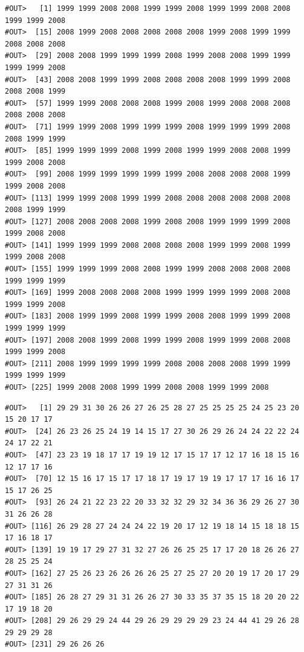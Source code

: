 \documentclass[]{book}
\newenvironment{Shaded}{\begin{snugshade}}{\end{snugshade}}
\newcommand{\OperatorTok}[1]{\textcolor[rgb]{0.81,0.36,0.00}{\textbf{#1}}}
\newcommand{\NormalTok}[1]{#1}
\theoremstyle{definition}
\theoremstyle{definition}
\theoremstyle{definition}
\theoremstyle{remark}
\begin{document}
\begin{Shaded}
\end{Shaded}

\begin{verbatim}
#OUT>   [1] 1999 1999 2008 2008 1999 1999 2008 1999 1999 2008 2008 1999 1999 2008
#OUT>  [15] 2008 1999 2008 2008 2008 2008 2008 1999 2008 1999 1999 2008 2008 2008
#OUT>  [29] 2008 2008 1999 1999 1999 2008 1999 2008 2008 1999 1999 1999 1999 2008
#OUT>  [43] 2008 2008 1999 1999 2008 2008 2008 2008 1999 1999 2008 2008 2008 1999
#OUT>  [57] 1999 1999 2008 2008 2008 1999 2008 1999 2008 2008 2008 2008 2008 2008
#OUT>  [71] 1999 1999 2008 1999 1999 1999 2008 1999 1999 1999 2008 2008 1999 1999
#OUT>  [85] 1999 1999 1999 2008 1999 2008 1999 1999 2008 2008 1999 1999 2008 2008
#OUT>  [99] 2008 1999 1999 1999 1999 1999 2008 2008 2008 2008 1999 1999 2008 2008
#OUT> [113] 1999 1999 2008 1999 1999 2008 2008 2008 2008 2008 2008 2008 1999 1999
#OUT> [127] 2008 2008 2008 2008 1999 2008 2008 1999 1999 1999 2008 1999 2008 2008
#OUT> [141] 1999 1999 1999 2008 2008 2008 2008 1999 1999 2008 1999 1999 2008 2008
#OUT> [155] 1999 1999 1999 2008 2008 1999 1999 2008 2008 2008 2008 1999 1999 1999
#OUT> [169] 1999 2008 2008 2008 2008 1999 1999 1999 1999 2008 2008 1999 1999 2008
#OUT> [183] 2008 1999 1999 2008 1999 1999 2008 2008 1999 1999 2008 1999 1999 1999
#OUT> [197] 2008 2008 1999 2008 1999 1999 2008 1999 1999 2008 2008 1999 1999 2008
#OUT> [211] 2008 1999 1999 1999 1999 2008 2008 2008 2008 1999 1999 1999 1999 1999
#OUT> [225] 1999 2008 2008 1999 1999 2008 2008 1999 1999 2008
\end{verbatim}

\begin{Shaded}
\end{Shaded}

\begin{verbatim}
#OUT>   [1] 29 29 31 30 26 26 27 26 25 28 27 25 25 25 25 24 25 23 20 15 20 17 17
#OUT>  [24] 26 23 26 25 24 19 14 15 17 27 30 26 29 26 24 24 22 22 24 24 17 22 21
#OUT>  [47] 23 23 19 18 17 17 19 19 12 17 15 17 17 12 17 16 18 15 16 12 17 17 16
#OUT>  [70] 12 15 16 17 15 17 17 18 17 19 17 19 19 17 17 17 16 16 17 15 17 26 25
#OUT>  [93] 26 24 21 22 23 22 20 33 32 32 29 32 34 36 36 29 26 27 30 31 26 26 28
#OUT> [116] 26 29 28 27 24 24 24 22 19 20 17 12 19 18 14 15 18 18 15 17 16 18 17
#OUT> [139] 19 19 17 29 27 31 32 27 26 26 25 25 17 17 20 18 26 26 27 28 25 25 24
#OUT> [162] 27 25 26 23 26 26 26 26 25 27 25 27 20 20 19 17 20 17 29 27 31 31 26
#OUT> [185] 26 28 27 29 31 31 26 26 27 30 33 35 37 35 15 18 20 20 22 17 19 18 20
#OUT> [208] 29 26 29 29 24 44 29 26 29 29 29 29 23 24 44 41 29 26 28 29 29 29 28
#OUT> [231] 29 26 26 26
\end{verbatim}
\end{document}
